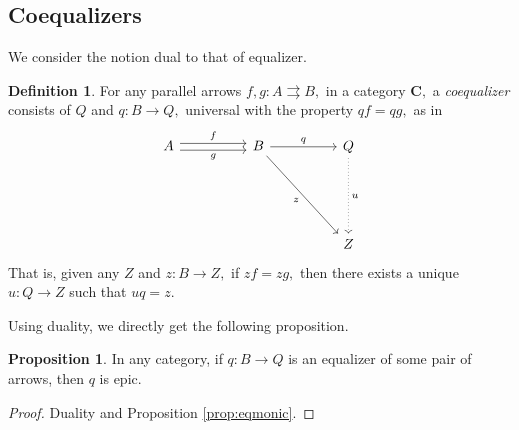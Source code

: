 \documentclass[11pt,leqno,landscape,semhelv]{seminar}
\theoremstyle{definition}
\newtheorem{prop}[thm]{Proposition}
\newtheorem{defn}[thm]{Definition}
\numberwithin{joke}{section}
\numberwithin{thm}{section}
\numberwithin{equation}{section}
\newcommand{\tto}{\rightrightarrows}
\begin{document}
\subsection{Coequalizers} \label{ssec:coeq}
We consider the notion dual to that of equalizer.
\begin{defn} 
  For any parallel arrows $f, g:A \tto B,$ in a category $\mathbf{C},$ a \emph{coequalizer} consists of $Q$ and $q:B \to Q,$ universal with the property $qf = qg,$ as in
  \begin{equation*} 
    \begin{tikzcd}
    A \arrow[rr, "g"', shift right] \arrow[rr, "f", shift left] && 
    B \arrow[rr, "q"] \arrow[rrddd, "z"'] &  & Q \arrow[ddd, "u", dotted] \\
    &&&&\\&&&&\\
    &&&& Z
    \end{tikzcd}
  \end{equation*}
  That is, given any $Z$ and $z:B\to Z,$ if $zf = zg,$ then there exists a unique $u:Q \to Z$ such that $uq = z.$
\end{defn}
Using duality, we directly get the following proposition.
\begin{prop}
  In any category, if $q:B\to Q$ is an equalizer of some pair of arrows, then $q$ is epic.
\end{prop}
\begin{proof} 
  Duality and Proposition \ref{prop:eqmonic}.
\end{proof}

\end{document}
